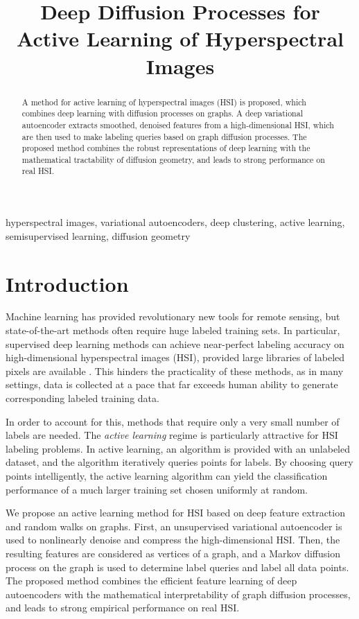 \documentclass{article}
\title{Deep Diffusion Processes for Active Learning of Hyperspectral Images}
\begin{document}
\maketitle

\begin{abstract} A method for active learning of hyperspectral images (HSI) is proposed, which combines deep learning with diffusion processes on graphs.  A deep variational autoencoder extracts smoothed, denoised features from a high-dimensional HSI, which are then used to make labeling queries based on graph diffusion processes.  The proposed method combines the robust representations of deep learning with the mathematical tractability of diffusion geometry, and leads to strong performance on real HSI.  

\end{abstract}

\begin{keywords}hyperspectral images, variational autoencoders, deep clustering, active learning, semisupervised learning, diffusion geometry\end{keywords}

\section{Introduction}
\label{sec:Introduction}
 
 Machine learning has provided revolutionary new tools for remote sensing, but state-of-the-art methods often require huge labeled training sets.  In particular, supervised deep learning methods can achieve near-perfect labeling accuracy on high-dimensional hyperspectral images (HSI), provided large libraries of labeled pixels are available \cite{Zhu2017_Deep}.  This hinders the practicality of these methods, as in many settings, data is collected at a pace that far exceeds human ability to generate corresponding labeled training data.
 
 In order to account for this, methods that require only a very small number of labels are needed.  The \emph{active learning} regime is particularly attractive for HSI labeling problems.  In active learning, an algorithm is provided with an unlabeled dataset, and the algorithm iteratively queries points for labels.  By choosing query points intelligently, the active learning algorithm can yield the classification performance of a much larger training set chosen uniformly at random.  
 
We propose an active learning method for HSI based on deep feature extraction and random walks on graphs.  First, an unsupervised variational autoencoder is used to nonlinearly denoise and compress the high-dimensional HSI.  Then, the resulting features are considered as vertices of a graph, and a Markov diffusion process on the graph is used to determine label queries and label all data points.  The proposed method combines the efficient feature learning of deep autoencoders with the mathematical interpretability of graph diffusion processes, and leads to strong empirical performance on real HSI.  
\end{document}
